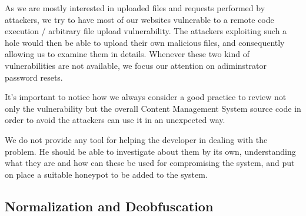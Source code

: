 As we are mostly interested in uploaded files and requests performed by attackers, we try to have most of our websites vulnerable to a remote code execution / arbitrary file upload vulnerability. The attackers exploiting such a hole would then be able to upload their own malicious files, and consequently allowing us to examine them in details. Whenever these two kind of vulnerabilities are not available, we focus our attention on adiminstrator password resets.

It's important to notice how we always consider a good practice to review not only the vulnerability but the overall Content Management System source code in order to avoid the attackers can use it in an unexpected way.

We do not provide any tool for helping the developer in dealing with the problem. He should be able to investigate about them by its own, understanding what they are and how can these be used for compromising the system, and put on place a suitable honeypot to be added to the system.

\subsection{Normalization and Deobfuscation}
